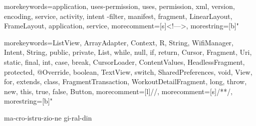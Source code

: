 {
	morekeywords={application, uses-permission, uses, permission, xml, version, encoding, service, activity, intent -filter, manifest, fragment, LinearLayout, FrameLayout,
	application, service},
	morecomment=[s]{<!--}{-->}, %
	morestring=[b]" %
}

{
	morekeywords={ListView, ArrayAdapter, Context, R, String, WifiManager, Intent, 
		String, public, private, List, while, null, if, return, Cursor, Fragment, Uri, 
		static, final, int, case, break, CursorLoader, ContentValues, HeadlessFragment, 
		protected, @Override, boolean, TextView, switch, SharedPreferences, void, 
		View, for, extends, class, FragmentTransaction, WorkoutDetailFragment, long, 
		throw, new, this, true, false, Button},
	morecomment=[l]{//},
	morecomment=[s]{/*}{*/},
	morestring=[b]"
}





\newcommand{\omissis}{[\dots\negthinspace]} %

\hyphenation
{
    ma-cro-istru-zio-ne
    gi-ral-din
}

\newcommand{\sectionname}{sezione}

\newcommand{\glsfirstoccur}{\ap{{[g]}}}

\newcommand{\intro}[1]{\emph{\textsf{#1}}}
